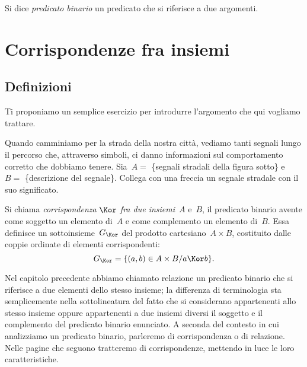 \begin{definizione}
Si dice \emph{predicato binario} un predicato che si riferisce a due argomenti.
\end{definizione}


\section{Corrispondenze fra insiemi}
\label{sec:corrispondenze}

\subsection{Definizioni}
\label{subsec:corr_definizioni}

Ti proponiamo un semplice esercizio per introdurre l'argomento che qui vogliamo 
trattare.

Quando camminiamo per la strada della nostra città, vediamo tanti segnali lungo 
il percorso che, attraverso simboli,
ci danno informazioni sul comportamento corretto che dobbiamo tenere. Sia~$A=$ 
\{segnali stradali della figura sotto\} e~$B=$ \{descrizione del segnale\}.
Collega con una freccia un segnale stradale con il suo significato.
\begin{center}
 
\end{center}

\begin{definizione}
Si chiama \emph{corrispondenza} $\Kor$ \emph{fra due insiemi}~$A$ e~$B$, il 
predicato binario avente come soggetto un elemento di~$A$ e come complemento un 
elemento di~$B$.
Essa definisce un sottoinsieme~$G_\Kor$ del prodotto cartesiano~$A \times B$, 
costituito dalle coppie ordinate di elementi corrispondenti:
\[ G_\Kor=\{(a,b)\in A \times B / a \Kor b \}.\]
\end{definizione}

\osservazione
Nel capitolo precedente abbiamo chiamato relazione un predicato binario che si 
riferisce a due elementi dello stesso insieme; la differenza di terminologia
sta semplicemente nella sottolineatura del fatto che si considerano appartenenti 
allo stesso insieme oppure appartenenti a due insiemi diversi il soggetto
e il complemento del predicato binario enunciato.
A seconda del contesto in cui analizziamo un predicato binario, parleremo di 
corrispondenza o di relazione. Nelle pagine che seguono tratteremo di 
corrispondenze,
mettendo in luce le loro caratteristiche.

